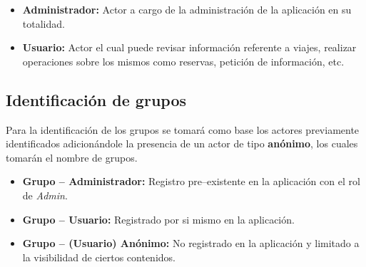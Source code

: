 \documentclass[oneside,12pt,a4paper]{memoir}%
\begin{document}
	\begin{itemize}
	  \item \textbf{Administrador: } Actor a cargo de la administraci\'on de
	  la aplicaci\'on en su totalidad.
	  \item \textbf{Usuario: } Actor el cual puede revisar informaci\'on referente
	  a viajes, realizar operaciones sobre los mismos como reservas, petici\'on de
	  informaci\'on, etc.
	\end{itemize}
	
		\subsection{Identificaci\'on de grupos}
		\label{ssec:groupIdentification}
		Para la identificaci\'on de los grupos se tomar\'a como base los actores
		previamente identificados adicion\'andole la presencia de un actor de tipo
		\textbf{an\'onimo}, los cuales tomar\'an el nombre de grupos.

		\begin{itemize}
		   \item \textbf{Grupo -- Administrador: } Registro pre--existente en la
		   aplicaci\'on con el rol de \textit{Admin}.
		   \item \textbf{Grupo -- Usuario: } Registrado por si mismo en la
		   aplicaci\'on.
		   \item \textbf{Grupo -- (Usuario) An\'onimo: } No registrado en la
		   aplicaci\'on y limitado a la visibilidad de ciertos contenidos.
		\end{itemize}
		  
\end{document}
